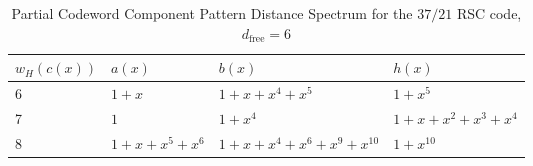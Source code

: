 \begin{table}[htbp]
 \caption{Partial Codeword Component Pattern Distance Spectrum for the $37/21$ RSC code, $d_{\text{free}}=6$}
\centering
 \begin{tabularx}{0.75\textwidth}{Xlll} 
 \hline
 $w_H(c(x))$&$a(x)$ & $b(x)$ & $h(x)$ \\ [0.5ex] 
 \hline\hline
6&$1+x$ & $1+x+x^{4}+x^5$ & $1+x^5$\\
\hline\hline
7&$1$ & $1+x^4$ & $1+x+x^2+x^3+x^4$\\
\hline\hline
8&$1+x+x^5+x^6$ & $1+x+x^4+x^6+x^9+x^{10}$ & $1+x^{10}$\\
\hline
 \end{tabularx}
 
 \label{novelTab14}
\end{table}

